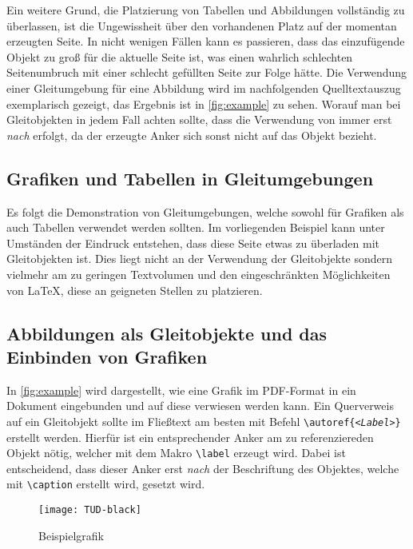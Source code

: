 \documentclass[%
  english,ngerman,%
  geometry=no,DIV=12,automark,%
]{tudscrartcl}
\begin{document}
Ein weitere Grund,  die Platzierung von Tabellen und Abbildungen 
vollständig zu überlassen, ist die Ungewissheit über den vorhandenen Platz auf 
der momentan erzeugten Seite. In nicht wenigen Fällen kann es passieren, dass 
das einzufügende Objekt zu groß für die aktuelle Seite ist, was einen wahrlich 
schlechten Seitenumbruch mit einer schlecht gefüllten Seite zur Folge hätte.
Die Verwendung einer Gleitumgebung für eine Abbildung wird im nachfolgenden 
Quelltextauszug exemplarisch gezeigt, das Ergebnis ist in \autoref{fig:example} 
zu sehen. Worauf man bei Gleitobjekten in jedem Fall achten sollte, dass die 
Verwendung von  immer erst \emph{nach}  erfolgt, da 
der erzeugte Anker sich sonst nicht auf das Objekt bezieht.
%
\begin{Trunk+}
\section{Grafiken und Tabellen in Gleitumgebungen}
Es folgt die Demonstration von Gleitumgebungen, welche sowohl für 
Grafiken als auch Tabellen verwendet werden sollten. Im vorliegenden 
Beispiel kann unter Umständen der Eindruck entstehen, dass diese Seite 
etwas zu überladen mit Gleitobjekten ist. Dies liegt nicht an der 
Verwendung der Gleitobjekte sondern vielmehr am zu geringen Textvolumen 
und den eingeschränkten Möglichkeiten von \LaTeX{}, diese an geigneten 
Stellen zu platzieren. 

\subsection{Abbildungen als Gleitobjekte und das Einbinden von Grafiken}
In \autoref{fig:example} wird dargestellt, wie eine Grafik im PDF-Format 
in ein Dokument eingebunden und auf diese verwiesen werden kann. Ein 
Querverweis auf ein Gleitobjekt sollte im Fließtext am besten mit Befehl 
\texttt{\textbackslash autoref\{\emph{<Label>}\}} erstellt werden. 
Hierfür ist ein entsprechender Anker am zu referenziereden Objekt nötig, 
welcher mit dem Makro \texttt{\textbackslash label} erzeugt wird. Dabei 
ist entscheidend, dass dieser Anker erst \emph{nach} der Beschriftung des 
Objektes, welche mit \texttt{\textbackslash caption} erstellt wird, 
gesetzt wird.

\end{Trunk+}
\begin{Trunk}
\begin{figure}
\centering
\texttt{[image: TUD-black]}
\caption{Beispielgrafik}\label{fig:example}
\end{figure}

\end{Trunk}
\end{document}
